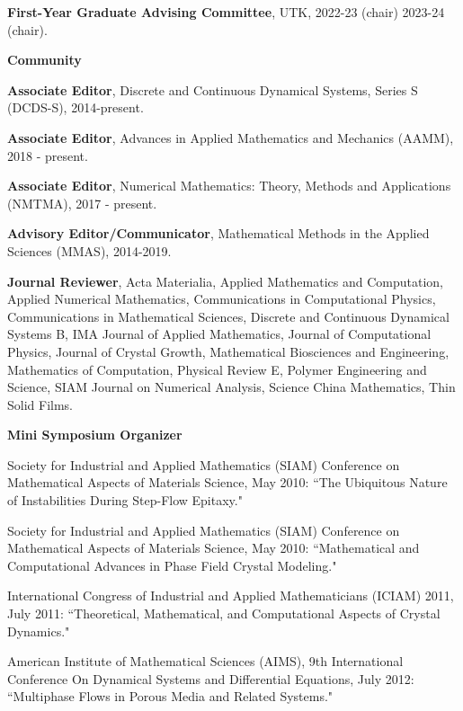 \documentclass[11pt]{letter}
\begin{document}
\begin{description}
\begin{description}
	\item
\textbf{First-Year Graduate Advising Committee}, UTK, 2022-23 (chair) 2023-24 (chair).


    \end{description}
    \item
{\Large\bf Community}
    \begin{description}
    \item
\textbf{Associate Editor},  Discrete and Continuous Dynamical Systems, Series S (DCDS-S), 2014-present.
	\item
\textbf{Associate Editor}, Advances in Applied Mathematics and Mechanics (AAMM), 2018 - present.
	\item
\textbf{Associate Editor}, Numerical Mathematics: Theory, Methods and Applications (NMTMA), 2017 - present.
    \item
\textbf{Advisory Editor/Communicator}, Mathematical Methods in the Applied Sciences (MMAS), 2014-2019.
    \item
\textbf{Journal Reviewer}, Acta Materialia, Applied Mathematics and Computation, Applied Numerical Mathematics, Communications in Computational Physics, Communications in Mathematical Sciences, Discrete and Continuous Dynamical Systems B, IMA Journal of Applied Mathematics, Journal of Computational Physics, Journal of Crystal Growth, Mathematical Biosciences and Engineering, Mathematics of Computation, Physical Review E, Polymer Engineering and Science, SIAM Journal on Numerical Analysis, Science China Mathematics, Thin Solid Films.
    \item
\textbf{Mini Symposium Organizer}
	\begin{description}
	\item
Society for Industrial and Applied Mathematics (SIAM) Conference on Mathematical Aspects of Materials Science, May 2010: ``The Ubiquitous Nature of Instabilities During Step-Flow Epitaxy."
    \item
Society for Industrial and Applied Mathematics (SIAM) Conference on Mathematical Aspects of Materials Science, May 2010: ``Mathematical and Computational Advances in Phase Field Crystal Modeling."
    \item
International Congress of Industrial and Applied Mathematicians (ICIAM) 2011, July 2011: ``Theoretical, Mathematical, and Computational Aspects of Crystal Dynamics."
	\item
American Institute of Mathematical Sciences (AIMS), 9th International Conference On Dynamical Systems and Differential Equations, July 2012: ``Multiphase Flows in Porous Media and Related Systems."

\end{description}
\end{description}
\end{description}
\end{document}
